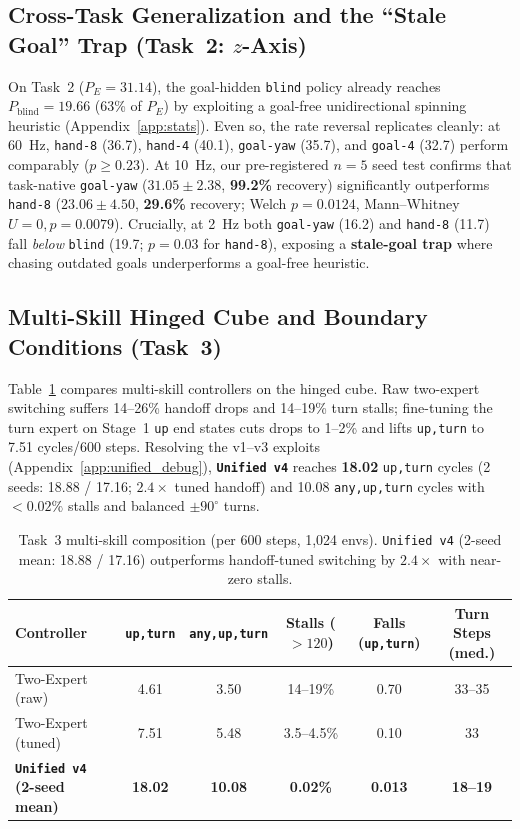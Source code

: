 \subsection{Cross-Task Generalization and the ``Stale Goal'' Trap (Task~2: $z$-Axis)}
\label{sec:exp_m2}
On Task~2 ($P_E = 31.14$), the goal-hidden \texttt{blind} policy already reaches $P_{\mathrm{blind}} = 19.66$ (63\% of $P_E$) by exploiting a goal-free unidirectional spinning heuristic (Appendix~\ref{app:stats}).
Even so, the rate reversal replicates cleanly: at 60~Hz, \texttt{hand-8} (36.7), \texttt{hand-4} (40.1), \texttt{goal-yaw} (35.7), and \texttt{goal-4} (32.7) perform comparably ($p \ge 0.23$).
At 10~Hz, our pre-registered $n=5$ seed test confirms that task-native \texttt{goal-yaw} ($31.05 \pm 2.38$, \textbf{99.2\%} recovery) significantly outperforms \texttt{hand-8} ($23.06 \pm 4.50$, \textbf{29.6\%} recovery; Welch $p=0.0124$, Mann--Whitney $U=0, p=0.0079$).
Crucially, at 2~Hz both \texttt{goal-yaw} (16.2) and \texttt{hand-8} (11.7) fall \emph{below} \texttt{blind} (19.7; $p=0.03$ for \texttt{hand-8}), exposing a \textbf{stale-goal trap} where chasing outdated goals underperforms a goal-free heuristic.

\subsection{Multi-Skill Hinged Cube and Boundary Conditions (Task~3)}
\label{sec:exp_task3}
Table~\ref{tab:unified_v4} compares multi-skill controllers on the hinged cube.
Raw two-expert switching suffers 14--26\% handoff drops and 14--19\% turn stalls; fine-tuning the turn expert on Stage~1 \texttt{up} end states cuts drops to 1--2\% and lifts \texttt{up,turn} to 7.51 cycles/600 steps.
Resolving the v1--v3 exploits (Appendix~\ref{app:unified_debug}), \textbf{\texttt{Unified v4}} reaches \textbf{18.02} \texttt{up,turn} cycles (2 seeds: 18.88 / 17.16; $2.4\times$ tuned handoff) and 10.08 \texttt{any,up,turn} cycles with $<0.02\%$ stalls and balanced $\pm 90^\circ$ turns.

\begin{table}[t]
  \centering
  \caption{Task~3 multi-skill composition (per 600 steps, 1,024 envs). \texttt{Unified v4} (2-seed mean: 18.88 / 17.16) outperforms handoff-tuned switching by $2.4\times$ with near-zero stalls.}
  \label{tab:unified_v4}
  \footnotesize
  \setlength{\tabcolsep}{4pt}
  \begin{tabular*}{\linewidth}{@{\extracolsep{\fill}}lccccc}
    \toprule
    Controller & \texttt{up,turn} & \texttt{any,up,turn} & Stalls ($>120$) & Falls (\texttt{up,turn}) & Turn Steps (med.) \\
    \midrule
    Two-Expert (raw) & 4.61 & 3.50 & 14--19\% & 0.70 & 33--35 \\
    Two-Expert (tuned) & 7.51 & 5.48 & 3.5--4.5\% & 0.10 & 33 \\
    \textbf{\texttt{Unified v4} (2-seed mean)} & \textbf{18.02} & \textbf{10.08} & \textbf{0.02\%} & \textbf{0.013} & \textbf{18--19} \\
    \bottomrule
  \end{tabular*}
\end{table}

